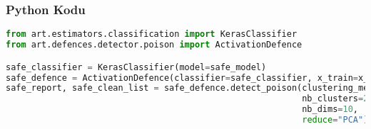 \subsubsection{Python Kodu}

\begin{lstlisting}[language=Python]
from art.estimators.classification import KerasClassifier
from art.defences.detector.poison import ActivationDefence

safe_classifier = KerasClassifier(model=safe_model)
safe_defence = ActivationDefence(classifier=safe_classifier, x_train=x_test, y_train=y_test)
safe_report, safe_clean_list = safe_defence.detect_poison(clustering_method="KMeans",
                                                          nb_clusters=2, 
                                                          nb_dims=10,
                                                          reduce="PCA")
\end{lstlisting}

\newpage